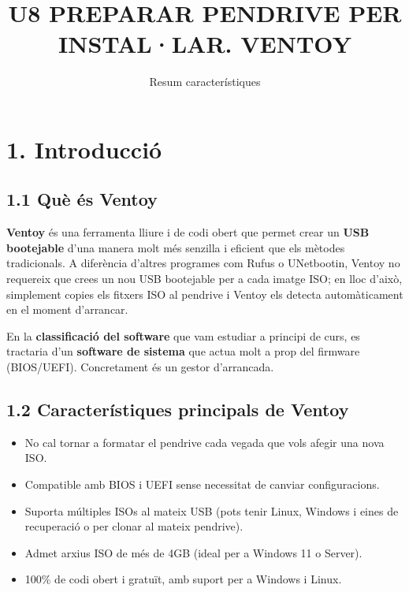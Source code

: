 \documentclass[
  12 pt,
  a4paper,
]{article}
\title{U8 PREPARAR PENDRIVE PER INSTAL·LAR. VENTOY}
\subtitle{Resum característiques}
\author{}
\date{\vspace{-2.5em}}
\providecommand{\tightlist}{%
  \setlength{\itemsep}{0pt}\setlength{\parskip}{0pt}}
\begin{document}
\maketitle

\newpage

\renewcommand\tablename{Tabla}

\section{1. Introducció}\label{introducciuxf3}

\subsection{1.1 Què és Ventoy}\label{quuxe8-uxe9s-ventoy}

\textbf{Ventoy} és una ferramenta lliure i de codi obert que permet
crear un \textbf{USB bootejable} d'una manera molt més senzilla i
eficient que els mètodes tradicionals. A diferència d'altres programes
com Rufus o UNetbootin, Ventoy no requereix que crees un nou USB
bootejable per a cada imatge ISO; en lloc d'això, simplement copies els
fitxers ISO al pendrive i Ventoy els detecta automàticament en el moment
d'arrancar.

En la \textbf{classificació del software} que vam estudiar a principi de
curs, es tractaria d'un \textbf{software de sistema} que actua molt a
prop del firmware (BIOS/UEFI). Concretament és un gestor d'arrancada.

\subsection{1.2 Característiques principals de
Ventoy}\label{caracteruxedstiques-principals-de-ventoy}

\begin{itemize}
\tightlist
\item
  No cal tornar a formatar el pendrive cada vegada que vols afegir una
  nova ISO.
\item
  Compatible amb BIOS i UEFI sense necessitat de canviar configuracions.
\item
  Suporta múltiples ISOs al mateix USB (pots tenir Linux, Windows i
  eines de recuperació o per clonar al mateix pendrive).
\item
  Admet arxius ISO de més de 4GB (ideal per a Windows 11 o Server).
\item
  100\% de codi obert i gratuït, amb suport per a Windows i Linux.
\end{itemize}
\end{document}
